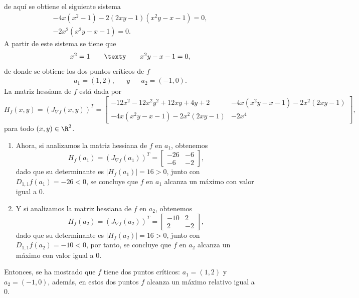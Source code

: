 \documentclass[a4,11pt]{aleph-examen}
\begin{document}
\begin{preguntas}
\begin{respuesta}
\begin{respuesta}
\begin{respuesta}
\begin{enumerate}
\begin{respuesta}
    de aquí se obtiene el siguiente sistema 
    \begin{align}
    -4x(x^2-1) - 2(2xy-1)(x^2y-x-1) = 0,\\
    -2x^2(x^2y-x-1) = 0.
    \end{align}
    A partir de este sistema se tiene que 
    \[    
    \begin{array}{ccccc}
	x^2 = 1 & & \texty & & x^2y-x-1 = 0,
	\end{array}
    \]
    de donde se obtiene los dos puntos críticos de $f$
     \[    
    \begin{array}{ccccc}
	a_1 = (1,2), & & y & & a_2 = (-1, 0).
	\end{array}
    \]
    La matriz hessiana de $f$ está dada por 
        \[
        H_f(x,y)= (J_{\nabla f} (x,y))^T = 
        \begin{bmatrix}
         -12x^2-12x^2y^2 + 12xy +4y +2 & -4x(x^2y-x-1)-2x^2(2xy-1) \\
         -4x(x^2y-x-1)-2x^2(2xy-1) & -2x^4
        \end{bmatrix},
    	\]
    para todo $(x, y)\in\R^2$.
    \begin{enumerate}
    \item Ahora, si analizamos la matriz hessiana de $f$ en $a_1$, obtenemos 
        \[
        H_f(a_1)= (J_{\nabla f} (a_1))^T = 
        \begin{bmatrix}
         -26 & -6 \\
         -6 & -2
        \end{bmatrix},
    	\]
    dado que su determinante es $|H_f(a_1)| = 16 > 0$, junto con $D_{1,1}f(a_1) = -26 < 0$, se concluye que $f$ en $a_1$ alcanza un máximo con valor igual a 0.
    \item Y si analizamos la matriz hessiana de $f$ en $a_2$, obtenemos 
        \[
        H_f(a_2)= (J_{\nabla f} (a_2))^T = 
        \begin{bmatrix}
         -10 & 2 \\
         2 & -2
        \end{bmatrix},
    	\]
    dado que su determinante es $|H_f(a_2)| = 16 > 0$, junto con $D_{1,1}f(a_2) = -10 < 0$, por tanto, se concluye que $f$ en $a_2$ alcanza un máximo con valor igual a 0.
    \end{enumerate}    
    Entonces, se ha mostrado que $f$ tiene dos puntos críticos: $a_1=(1,2)$ y $a_2=(-1,0)$, además, en estos dos puntos $f$ alcanza un máximo relativo igual a 0.
\end{respuesta}


\end{enumerate}
\end{respuesta}
\end{respuesta}
\end{respuesta}
\end{preguntas}
\end{document}
